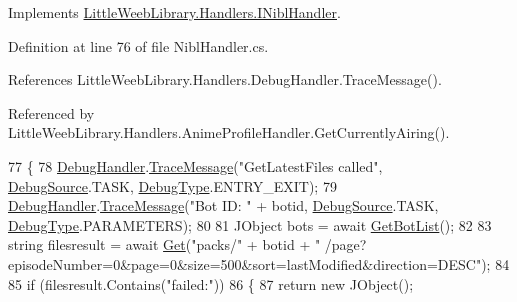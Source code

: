 Implements \mbox{\hyperlink{interface_little_weeb_library_1_1_handlers_1_1_i_nibl_handler_a744548c45993c925a492744f1fb747e9}{Little\+Weeb\+Library.\+Handlers.\+I\+Nibl\+Handler}}.



Definition at line 76 of file Nibl\+Handler.\+cs.



References Little\+Weeb\+Library.\+Handlers.\+Debug\+Handler.\+Trace\+Message().



Referenced by Little\+Weeb\+Library.\+Handlers.\+Anime\+Profile\+Handler.\+Get\+Currently\+Airing().


\begin{DoxyCode}
77         \{
78             \mbox{\hyperlink{class_little_weeb_library_1_1_handlers_1_1_nibl_handler_a334c2111588fa71d1203bd8cbb572970}{DebugHandler}}.\mbox{\hyperlink{interface_little_weeb_library_1_1_handlers_1_1_i_debug_handler_a2e405bc3492e683cd3702fae125221bc}{TraceMessage}}(\textcolor{stringliteral}{"GetLatestFiles called"}, 
      \mbox{\hyperlink{namespace_little_weeb_library_1_1_handlers_a2a6ca0775121c9c503d58aa254d292be}{DebugSource}}.TASK, \mbox{\hyperlink{namespace_little_weeb_library_1_1_handlers_ab66019ed40462876ec4e61bb3ccb0a62}{DebugType}}.ENTRY\_EXIT);
79             \mbox{\hyperlink{class_little_weeb_library_1_1_handlers_1_1_nibl_handler_a334c2111588fa71d1203bd8cbb572970}{DebugHandler}}.\mbox{\hyperlink{interface_little_weeb_library_1_1_handlers_1_1_i_debug_handler_a2e405bc3492e683cd3702fae125221bc}{TraceMessage}}(\textcolor{stringliteral}{"Bot ID: "} + botid, 
      \mbox{\hyperlink{namespace_little_weeb_library_1_1_handlers_a2a6ca0775121c9c503d58aa254d292be}{DebugSource}}.TASK, \mbox{\hyperlink{namespace_little_weeb_library_1_1_handlers_ab66019ed40462876ec4e61bb3ccb0a62}{DebugType}}.PARAMETERS);
80 
81             JObject bots = await \mbox{\hyperlink{class_little_weeb_library_1_1_handlers_1_1_nibl_handler_aac05976a2e1a688dd187ccca513ab3cc}{GetBotList}}();
82 
83             \textcolor{keywordtype}{string} filesresult = await \mbox{\hyperlink{class_little_weeb_library_1_1_handlers_1_1_nibl_handler_a2989b180582fadd05111d010c0700411}{Get}}(\textcolor{stringliteral}{"packs/"} + botid + \textcolor{stringliteral}{"
      /page?episodeNumber=0&page=0&size=500&sort=lastModified&direction=DESC"});
84                                           
85             \textcolor{keywordflow}{if} (filesresult.Contains(\textcolor{stringliteral}{"failed:"}))
86             \{
87                 \textcolor{keywordflow}{return} \textcolor{keyword}{new} JObject();

\end{DoxyCode}
